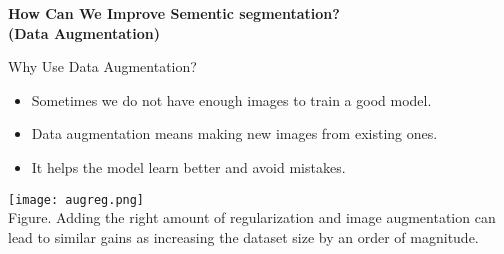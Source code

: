 \begin{refsection}
  \begin{frame}
    \centering
    \vspace{2.5cm}
    {\LARGE \textbf{How Can We Improve Sementic segmentation?}\\[0.5em]
    \textbf{(Data Augmentation)}}
  \end{frame}
  \end{refsection}
  
  \begin{refsection}
  \begin{frame}{Why Use Data Augmentation?}
    \begin{minipage}{0.48\linewidth}
      \begin{itemize}
        \item Sometimes we do not have enough images to train a good model.
        \item Data augmentation means making new images from existing ones.
        \item It helps the model learn better and avoid mistakes.
      \end{itemize}
    \end{minipage}%
    \hfill
    \begin{minipage}{0.48\linewidth}
      \centering
      \texttt{[image: augreg.png]}
      \scriptsize \\
      Figure. Adding the right amount of regularization and image augmentation can lead to similar gains as increasing the dataset size by an order of magnitude.~\parencite{steinerHowTrainYour2022}
    \end{minipage}
    \bottomleftrefs
  \end{frame}
  \end{refsection}
  
